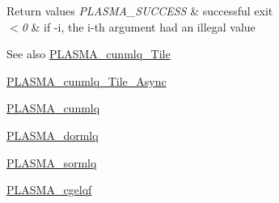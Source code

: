 \begin{DoxyRetVals}{Return values}
{\em P\+L\+A\+S\+M\+A\+\_\+\+S\+U\+C\+C\+E\+S\+S} & successful exit \\
\hline
{\em $<$0} & if -\/i, the i-\/th argument had an illegal value\\
\hline
\end{DoxyRetVals}
\begin{DoxySeeAlso}{See also}
\hyperlink{group__PLASMA__Complex32__t__Tile_ga7dc256d207a8f2d2aa69b2b640d931fd_ga7dc256d207a8f2d2aa69b2b640d931fd}{P\+L\+A\+S\+M\+A\+\_\+cunmlq\+\_\+\+Tile} 

\hyperlink{group__PLASMA__Complex32__t__Tile__Async_gadba639660ec87b31c2340da05fcc4f5d_gadba639660ec87b31c2340da05fcc4f5d}{P\+L\+A\+S\+M\+A\+\_\+cunmlq\+\_\+\+Tile\+\_\+\+Async} 

\hyperlink{group__PLASMA__Complex32__t_gac9aca2d8444a6e5630fe4674505a2afd_gac9aca2d8444a6e5630fe4674505a2afd}{P\+L\+A\+S\+M\+A\+\_\+cunmlq} 

\hyperlink{group__double_ga7c70d5b53e69f9ab564126c78938002a_ga7c70d5b53e69f9ab564126c78938002a}{P\+L\+A\+S\+M\+A\+\_\+dormlq} 

\hyperlink{group__float_ga4f42eb41e34bdf290b36fe5ce8e576b7_ga4f42eb41e34bdf290b36fe5ce8e576b7}{P\+L\+A\+S\+M\+A\+\_\+sormlq} 

\hyperlink{group__PLASMA__Complex32__t_gadab1e78967134c5e784bb80d03760b25_gadab1e78967134c5e784bb80d03760b25}{P\+L\+A\+S\+M\+A\+\_\+cgelqf} 
\end{DoxySeeAlso}
\hypertarget{group__PLASMA__Complex32__t_gac4f6c16a5e7d9bc92ec6addcaa42bad1_gac4f6c16a5e7d9bc92ec6addcaa42bad1}{}
